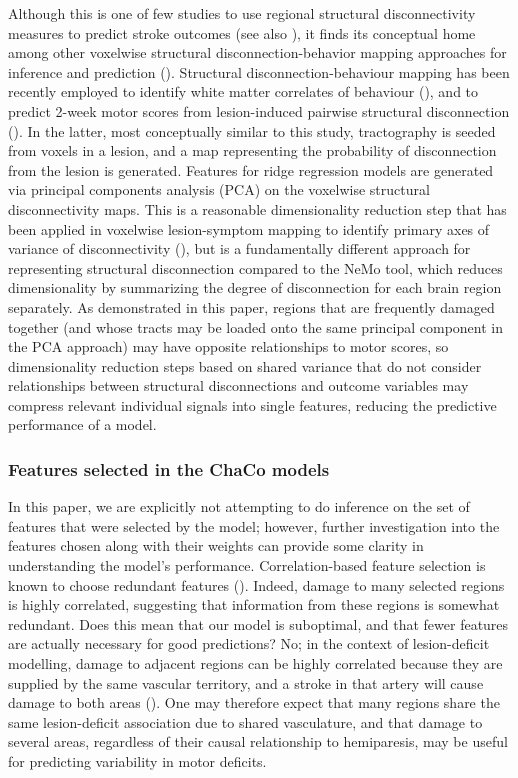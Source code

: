 \documentclass[10pt]{article}
\begin{document}
Although this is one of few studies to use regional structural disconnectivity measures to predict stroke outcomes (see also \cite{Tozlu2020-qa, Kuceyeski2016-vj}), it finds its conceptual home among other voxelwise structural disconnection-behavior mapping approaches for inference and prediction (\cite{Salvalaggio2020-pe, Wawrzyniak2022-kl, Foulon2018-bj, Sperber2022-oj}). Structural disconnection-behaviour mapping has been recently employed to identify white matter correlates of behaviour (\cite{Wawrzyniak2022-kl, Foulon2018-bj}), and to predict 2-week motor scores from lesion-induced pairwise structural disconnection (\cite{Salvalaggio2020-pe}). In the latter, most conceptually similar to this study, tractography is seeded from voxels in a lesion, and a map representing the probability of disconnection from the lesion is generated. Features for ridge regression models are generated via principal components analysis (PCA) on the voxelwise structural disconnectivity maps. This is a reasonable dimensionality reduction step that has been applied in voxelwise lesion-symptom mapping to identify primary axes of variance of disconnectivity (\cite{Ivanova2021-nh}), but is a fundamentally different approach for representing structural disconnection compared to the NeMo tool, which reduces dimensionality by summarizing the degree of disconnection for each brain region separately. As demonstrated in this paper, regions that are frequently damaged together (and whose tracts may be loaded onto the same principal component in the PCA approach) may have opposite relationships to motor scores, so dimensionality reduction steps based on shared variance that do not consider relationships between structural disconnections and outcome variables may compress relevant individual signals into single features, reducing the predictive performance of a model. 

\subsubsection*{Features selected in the ChaCo models}

In this paper, we are explicitly not attempting to do inference on the set of features that were selected by the model; however, further investigation into the features chosen along with their weights can provide some clarity in understanding the model's performance. Correlation-based feature selection is known to choose redundant features (\cite{Guyon2003-kj}). Indeed, damage to many selected regions is highly correlated, suggesting that information from these regions is somewhat redundant. Does this mean that our model is suboptimal, and that fewer features are actually necessary for good predictions? No; in the context of lesion-deficit modelling, damage to adjacent regions can be highly correlated because they are supplied by the same vascular territory, and a stroke in that artery will cause damage to both areas (\cite{Mah2014-cb, Sperber2020-kp}). One may therefore expect that many regions share the same lesion-deficit association due to shared vasculature, and that damage to several areas, regardless of their causal relationship to hemiparesis, may be useful for predicting variability in motor deficits. 
\end{document}
